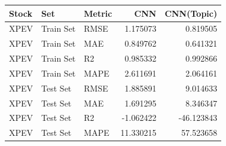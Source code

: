 \begin{tabular}{lllrr}
\toprule
Stock & Set & Metric & CNN & CNN(Topic) \\
\midrule
XPEV & Train Set & RMSE & 1.175073 & 0.819505 \\
XPEV & Train Set & MAE & 0.849762 & 0.641321 \\
XPEV & Train Set & R2 & 0.985332 & 0.992866 \\
XPEV & Train Set & MAPE & 2.611691 & 2.064161 \\
XPEV & Test Set & RMSE & 1.885891 & 9.014633 \\
XPEV & Test Set & MAE & 1.691295 & 8.346347 \\
XPEV & Test Set & R2 & -1.062422 & -46.123843 \\
XPEV & Test Set & MAPE & 11.330215 & 57.523658 \\
\bottomrule
\end{tabular}

